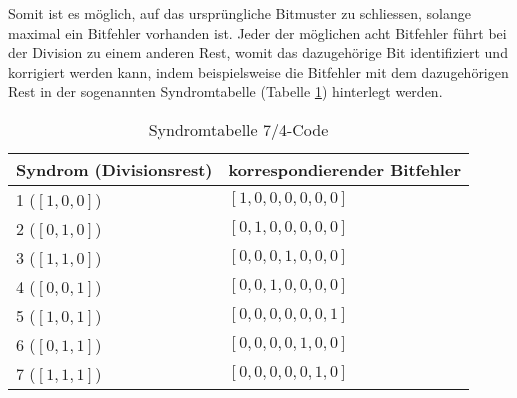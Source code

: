 Somit ist es möglich, auf das ursprüngliche Bitmuster zu schliessen, solange maximal ein Bitfehler vorhanden ist.
Jeder der möglichen acht Bitfehler führt bei der Division zu einem anderen Rest,
womit das dazugehörige Bit identifiziert und korrigiert werden kann,
indem beispielsweise die Bitfehler mit dem dazugehörigen Rest in der sogenannten Syndromtabelle (Tabelle \ref{mceliece:tab:syndrome}) hinterlegt werden.
%
\begin{table}
    \begin{center}
        \begin{tabular}{|l|l|}
            \hline
            Syndrom (Divisionsrest)     &korrespondierender Bitfehler\\
            \hline
            1 ($[1,0,0]$)               &$[1,0,0,0,0,0,0]$\\    
            2 ($[0,1,0]$)               &$[0,1,0,0,0,0,0]$\\    
            3 ($[1,1,0]$)               &$[0,0,0,1,0,0,0]$\\    
            4 ($[0,0,1]$)               &$[0,0,1,0,0,0,0]$\\    
            5 ($[1,0,1]$)               &$[0,0,0,0,0,0,1]$\\    
            6 ($[0,1,1]$)               &$[0,0,0,0,1,0,0]$\\    
            7 ($[1,1,1]$)               &$[0,0,0,0,0,1,0]$\\
            \hline

        \end{tabular}
    \end{center}
    \caption{\label{mceliece:tab:syndrome}Syndromtabelle 7/4-Code}
\end{table}
%
